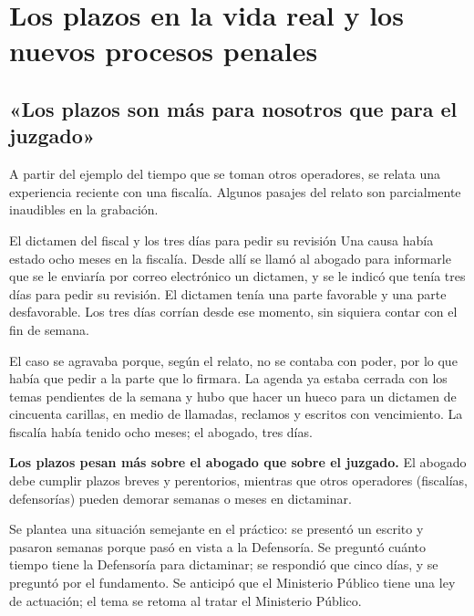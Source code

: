 \documentclass[12pt,oneside]{book}
\begin{document}
\chapter[Plazos y procesos penales]{Los plazos en la vida real y los nuevos procesos penales}

\section{«Los plazos son más para nosotros que para el juzgado»}

A partir del ejemplo del tiempo que se toman otros operadores, se relata una experiencia reciente con una fiscalía. Algunos pasajes del relato son parcialmente inaudibles en la grabación.

\begin{example}{El dictamen del fiscal y los tres días para pedir su revisión}
Una causa había estado ocho meses en la fiscalía. Desde allí se llamó al abogado para informarle que se le enviaría por correo electrónico un dictamen, y se le indicó que tenía tres días para pedir su revisión. El dictamen tenía una parte favorable y una parte desfavorable. Los tres días corrían desde ese momento, sin siquiera contar con el fin de semana.

El caso se agravaba porque, según el relato, no se contaba con poder, por lo que había que pedir a la parte que lo firmara. La agenda ya estaba cerrada con los temas pendientes de la semana y hubo que hacer un hueco para un dictamen de cincuenta carillas, en medio de llamadas, reclamos y escritos con vencimiento. La fiscalía había tenido ocho meses; el abogado, tres días.
\end{example}

\begin{important}
\textbf{Los plazos pesan más sobre el abogado que sobre el juzgado.} El abogado debe cumplir plazos breves y perentorios, mientras que otros operadores (fiscalías, defensorías) pueden demorar semanas o meses en dictaminar.
\end{important}

Se plantea una situación semejante en el práctico: se presentó un escrito y pasaron semanas porque pasó en vista a la Defensoría. Se preguntó cuánto tiempo tiene la Defensoría para dictaminar; se respondió que cinco días, y se preguntó por el fundamento. Se anticipó que el Ministerio Público tiene una ley de actuación; el tema se retoma al tratar el Ministerio Público.
\end{document}
